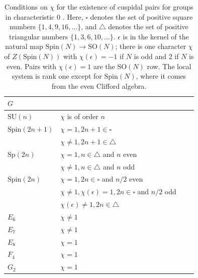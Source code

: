 \documentclass[12pt]{article}
\numberwithin{equation}{section}%
\theoremstyle{definition}
\newcommand{\SU}{\mathrm{SU}}
\newcommand{\Sp}{\mathrm{Sp}}
\newcommand{\SO}{\mathrm{SO}}
\newcommand{\Spin}{\mathrm{Spin}}
\begin{document}
\begin{table}[htbp]
\centering
\small
\begin{tabular}{llll}
\toprule
$G$ &  \\
\midrule
$\SU(n)$ & $\chi$ is of order $n$\\
$\Spin(2n + 1)$ & $\chi = 1, 2n + 1 \in \square$ \\
& $\chi \neq 1, 2n + 1 \in \triangle$ \\
$\Sp(2n)$ &  $\chi = 1, n \in \triangle$ and $n$ even \\
& $\chi \neq 1, n \in \triangle$ and $n$ odd \\
$\Spin(2n)$ & $\chi = 1, 2n \in \square$ and $n/2$ even \\
& $\chi \neq 1, \chi(\epsilon) = 1, 2n \in \square$ and $n/2$ odd \\
& $\chi(\epsilon) \neq 1, 2n \in \triangle$ \\
$E_6$ & $\chi \neq 1$ \\
$E_7$ & $\chi \neq 1$ \\
$E_8$ & $\chi = 1$ \\
$F_4$ & $\chi = 1$ \\
$G_2$ & $\chi = 1$ \\
\bottomrule
\end{tabular}
\caption{Conditions on $\chi$ for the existence of cuspidal pairs for groups in characteristic $0$
\cite{MR732546, MR803339}.  Here, $\square$ denotes the set of positive square numbers $\{1, 4, 9, 16, \dots \}$, and $\triangle$ denotes the set of positive triangular numbers $\{1, 3, 6, 10, \dots \}$.
$\epsilon$ is in the kernel of the natural map $\Spin(N)\to\SO(N)$; there is one character $\chi$
of $Z(\Spin(N))$ with $\chi(\epsilon)=-1$ if $N$ is odd and 2 if $N$ is even.
Pairs with $\chi(\epsilon)=1$ are the $\SO(N)$ row.  The local system is
rank one except for $\Spin(N)$, where it comes from the even Clifford algebra.}
\label{tab:cuspidal}
\end{table}
\end{document}
